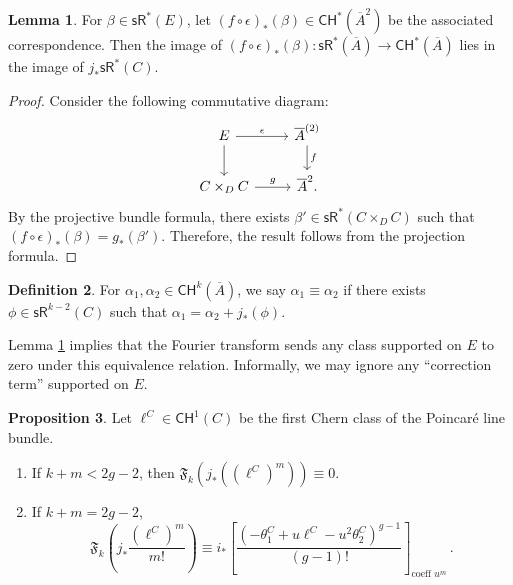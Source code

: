 \documentclass[11pt]{article}
\def\CH{\mathsf{CH}}
\def\sR{\mathsf{sR}}
\def\fm{\mathfrak{F}}
\newcommand{\barA}{\overline{A}}
\theoremstyle{definition}
\newtheorem{definition}{Definition}[section]
\newtheorem{proposition}[definition]{Proposition}
\newtheorem{lemma}[definition]{Lemma}
\begin{document}
\begin{lemma}\label{lem:Fex}
	For $\beta\in \sR^*(E)$, let $(f\circ \epsilon)_*(\beta) \in \CH^*(\barA^2)$ be the associated correspondence. Then the image of $(f\circ \epsilon)_*(\beta) : \sR^*(\barA)\to \CH^*(\barA)$ lies in the image of $j_*\sR^*(C)$.
\end{lemma}

\begin{proof}
    Consider the following commutative diagram:
    \[
    \begin{tikzcd}
        E \ar[r,"\epsilon"]\ar[d] & \barA^{(2)}\ar[d,"f"]\\
        C\times_{D} C\ar[r,"g"] & \barA^2.
    \end{tikzcd}
    \]
    By the projective bundle formula, there exists $\beta'\in \sR^*(C\times_{D} C)$ such that $(f\circ \epsilon)_*(\beta) = g_*(\beta')$. Therefore, the result follows from the projection formula.
\end{proof}

\begin{definition}\label{def:equiv}
    For $\alpha_1,\alpha_2\in \CH^k(\barA)$, we say $\alpha_1 \equiv \alpha_2$ if there exists $\phi \in \sR^{k-2}(C)$ such that $\alpha_1 = \alpha_2 + j_*(\phi)$.
\end{definition}

Lemma \ref{lem:Fex} implies that the Fourier transform sends any class supported on $E$ to zero under this equivalence relation. Informally,
we may ignore any ``correction term'' supported on $E$.

\begin{proposition}\label{pro:jclosed}
    Let $\ell^C\in \CH^1(C)$ be the first Chern class of the Poincar\'e line bundle.
    \begin{enumerate}[label = (\alph*)]
        \item If $k+m<2g-2$, then $\fm_k (j_*((\ell^C)^m)) \equiv 0$.
        \item If $k+m=2g-2$,
        \[
        \fm_k \left(j_*\frac{(\ell^C)^m}{m!}\right) \equiv i_* \left[ \frac{(-\theta_1^C + u\ell^C - u^2\theta_2^C)^{g-1}}{(g-1)!}\right]_{\text{coeff } u^m}\,.
        \]
    \end{enumerate}
\end{proposition}
\end{document}
